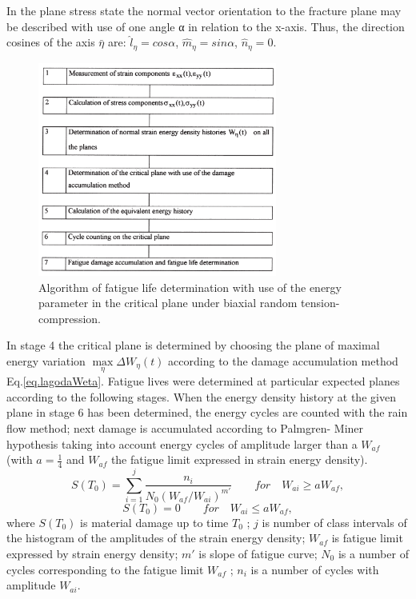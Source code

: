 In the plane stress state the normal vector orientation
to the fracture plane may be described with use of one
angle α in relation to the x-axis. Thus, the direction
cosines of the axis $\bar{\eta}$ are:
$\hat{l}_\eta=cos\alpha$, $\hat{m}_\eta=sin\alpha$, $\hat{n}_\eta=0$.
\begin{figure}[h!]
	\centering
	\includegraphics[width=0.7\textwidth]{figures//algorithm.png} 
	\caption{Algorithm of fatigue life determination with use of the energy parameter in the critical plane under biaxial random tension-compression.}
	\label{fig.algorithm}
\end{figure}
In stage 4 the critical plane is determined by choosing the plane of maximal energy variation $\max \limits_{\eta}\Delta W_{\eta}(t)$ according to
the damage accumulation method Eq.\ref{eq.lagodaWeta}. Fatigue lives
were determined at particular expected planes according
to the following stages. When the energy density history
at the given plane in stage 6 has been determined, the
energy cycles are counted with the rain flow method;
next damage is accumulated according to Palmgren-
Miner hypothesis taking into account energy
cycles of amplitude larger than a $W_{af}$ (with $a=\frac{1}{4}$ and $W_{af}$ the fatigue limit expressed in strain energy density).
$$S(T_0)=\sum_{i=1}^{j}\dfrac{n_i}{N_0(W_{af}/W_{ai})^{m'}} \qquad for \quad W_{ai} \geqslant aW_{af},$$
$$S(T_0)=0 \qquad for \quad W_{ai} \leqslant aW_{af},$$
where $S(T_0)$ is material damage up to time $T_0$ ; $j$ is number of class intervals of the histogram of the amplitudes
of the strain energy density; $W_{af}$ is fatigue limit
expressed by strain energy density;  $m'$ is slope of fatigue curve; $N_0$ is a number of cycles corresponding to the fatigue
limit $W_{af}$ ; $n_i$ is a number of cycles with amplitude $W_{ai}$.

